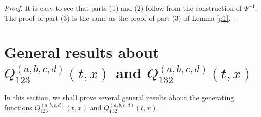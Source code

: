 \documentclass[
final,nomarks
]{dmtcs-episciences}
\newcommand{\Qmm}[1]{Q_{132}^{(#1)}(t,x)}
\newcommand{\Qm}[1]{Q_{123}^{(#1)}(t,x)}
\begin{document}
\begin{proof}
	It is easy to see that parts (1) and (2) follow from the construction of \begin{math}\Psi^{-1}\end{math}. The proof 
	of part (3) is the same as the proof of part (3) of Lemma \ref{p1}. 
\end{proof}








\section{General results about \(\Qm{a,b,c,d}\) and \(\Qmm{a,b,c,d}\)}


In this section, we shall prove several general results about the generating functions
\begin{math}\Qm{a,b,c,d}\end{math} and \begin{math}\Qmm{a,b,c,d}\end{math}. 
\end{document}
